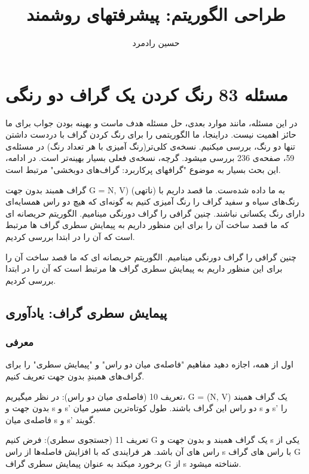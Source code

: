 \documentclass{book} %
\begin{document}
\title{طراحی الگوریتم: پیشرفتهای روشمند}
\author{حسین رادمرد}


\maketitle

\section{مسئله 83 رنگ کردن یک گراف دو رنگی}

در این مسئله، مانند موارد بعدی، حل مسئله هدف ماست و بهینه بودن جواب برای ما حائز اهمیت نیست. دراینجا، ما الگوریتمی را برای رنگ کردن گراف با دردست داشتن تنها دو رنگ، بررسی میکنیم. نسخه‌ی کلی‌تر(رنگ آمیزی با هر تعداد رنگ) در مسئله‌ی 59، صفحه‌ی 236 بررسی میشود. گرچه، نسخه‌ی فعلی بسیار بهینه‌تر است. در ادامه، این بحث بسیار به موضوع "گرافهای پرکاربرد: گراف‌های دوبخشی" مرتبط است.

گراف همبند بدون جهت 
{G = N, V)}\lr
 (ناتهی) به ما داده شده‌ست. ما قصد داریم با رنگ‌های سیاه و سفید گراف را رنگ آمیزی کنیم به گونه‌ای که هیچ دو راس همسایه‌ای دارای رنگ یکسانی نباشند. چنین گرافی را گراف دورنگی مینامیم. الگوریتم حریصانه ای که ما قصد ساخت آن را برای این منظور داریم به پیمایش سطری گراف ها مرتبط است که آن را در ابتدا بررسی کردیم.


 چنین گرافی را گراف دورنگی مینامیم. الگوریتم حریصانه ای که ما قصد ساخت آن را برای این منظور داریم به پیمایش سطری گراف ها مرتبط است که آن را در ابتدا بررسی کردیم.
\subsection*{پیمایش سطری گراف: یادآوری}
\subsubsection*{معرفی}

اول از همه، اجازه دهید مفاهیم "فاصله‌ی میان دو راس" و "پیمایش سطری" را برای گراف‌های همبندِ بدون جهت تعریف کنیم.

تعریف 10 (فاصله‌ی میان دو راس):
در نظر میگیریم، G = (N, V) یک گراف همبند بدون جهت و s و s' دو راس این گراف باشند. طول کوتاه‌ترین مسیر میان s و s' را فاصله‌ی میان s و s' گویند.


تعریف 11 (جستجوی سطری):
فرض کنیم G یک گراف همبند و بدون جهت و s یکی از راس های آن باشد. هر فرایندی که با افزایش فاصله‌ها از راس s با راس های گراف G برخورد میکند به عنوان پیمایش سطری گراف G از s شناخته میشود.  
\end{document}
